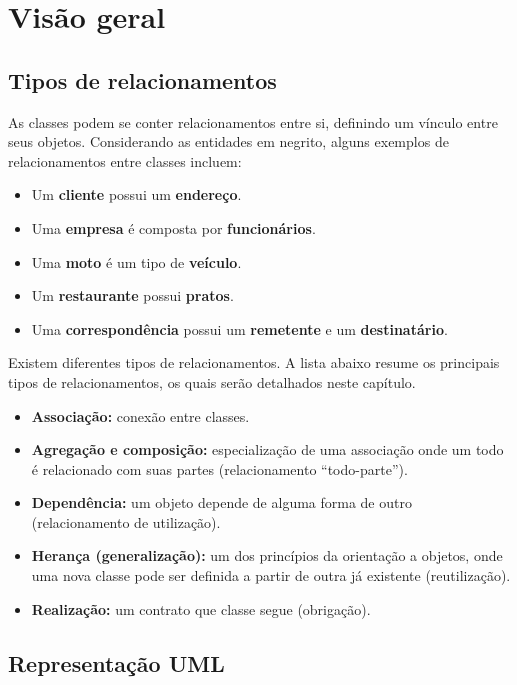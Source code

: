 \chapter{Visão geral}

\section{Tipos de relacionamentos}

As classes podem se conter relacionamentos entre si, definindo um vínculo entre seus objetos. Considerando as entidades em negrito, alguns exemplos de relacionamentos entre classes incluem:

\begin{itemize}
	\item Um \textbf{cliente} possui um \textbf{endereço}.
	\item Uma \textbf{empresa} é composta por \textbf{funcionários}.
	\item Uma \textbf{moto} é um tipo de \textbf{veículo}.
	\item Um \textbf{restaurante} possui \textbf{pratos}.
	\item Uma \textbf{correspondência} possui um \textbf{remetente} e um \textbf{destinatário}.
\end{itemize}

Existem diferentes tipos de relacionamentos. A lista abaixo resume os principais tipos de relacionamentos, os quais serão detalhados neste capítulo.

\begin{itemize}
	\item \textbf{Associação:} conexão entre classes.
	\item \textbf{Agregação e composição:} especialização de uma associação onde um todo é relacionado com suas partes (relacionamento ``todo-parte'').
	\item \textbf{Dependência:} um objeto depende de alguma forma de outro (relacionamento de utilização).
	\item \textbf{Herança (generalização):} um dos princípios da orientação a objetos, onde uma nova classe pode ser definida a partir de outra já existente (reutilização).
	\item \textbf{Realização:} um contrato que classe segue (obrigação).
\end{itemize}

\section{Representação UML}


